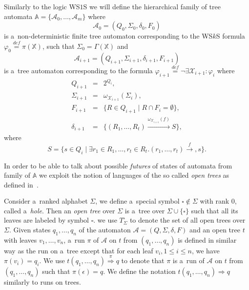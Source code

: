 Similarly to the logic WS$1$S we will define the hierarchical family of tree
automata $\mathbb{A} = \{\mathcal{A}_0,\ldots,\mathcal{A}_m\}$ where
\begin{equation}
 \mathcal{A}_0 = (Q_0, \Sigma_0, \delta_0, F_0)
\end{equation} is a~non-deterministic finite tree automaton corresponding to the
WS$k$S formula $\varphi_0 \overset{\mathit{def}}{=} \pi(\mathbb{X})$, such that
$\Sigma_0 = \Gamma(\mathbb{X})$ and
\begin{equation}
 \mathcal{A}_{i+1} = (Q_{i+1}, \Sigma_{i+1}, \delta_{i+1}, F_{i+1})
\end{equation}
is a~tree automaton corresponding to the formula $\varphi_{i+1}
\overset{\mathit{def}}{=} \neg\exists\mathcal{X}_{i+1}: \varphi_i$ where
\begin{eqnarray}
 Q_{i+1} & = & 2^{Q_i},\\
 \Sigma_{i+1} & = & \omega_{\mathcal{X}_{i+1}}(\Sigma_i),\\
 F_{i+1} & = & \{R \in Q_{i+1} \mid R \cap F_i = \emptyset\},\\
 \delta_{i+1} & = & \{(R_1,\ldots,R_t)
 \overset{\omega_{\mathcal{X}_{i+1}}(f)}{\longrightarrow} S\},
\end{eqnarray}
where
\begin{equation}
S = \{s \in Q_i \mid \exists r_1 \in R_1,\ldots,r_t \in R_t.
 (r_1,\ldots,r_t) \overset{f}{\longrightarrow}, s\}.
\end{equation}

In order to be able to talk about possible \emph{futures} of states of automata
from family of $\mathbb{A}$ we exploit the notion of languages of the so called
\emph{open trees} as defined in~\cite{tacas}.

Consider a~ranked alphabet $\Sigma$, we define a~special symbol $\square \notin
\Sigma$ with rank 0, called a~\emph{hole}. Then an \emph{open tree} over
$\Sigma$ is a~tree over $\Sigma \cup \{\square\}$ such that all its leaves are
labeled by symbol $\square$. we use $T_\Sigma^\square$ to denote the set of all
open trees over $\Sigma$. Given states $q_1,\ldots,q_n$ of the automaton
$\mathcal{A} = (Q, \Sigma, \delta, F)$ and an open tree $t$ with leaves
$v_1,\ldots,v_n$, a~run $\pi$ of $\mathcal{A}$ on $t$ from $(q_1,\ldots,q_n)$ is
defined in similar way as the run on a~tree except that for each leaf $v_i, 1
\leq i \leq n$, we have $\pi(v_i) = q_i$. We use $t(q_1,\ldots,q_n)
\overset{\pi}{\Longrightarrow} q$ to denote that $\pi$ is a~run of $\mathcal{A}$
on $t$ from $(q_1,\ldots,q_n)$ such that $\pi(\epsilon) = q$. We define the
notation $t(q_1,\ldots,q_n) \Longrightarrow q$ similarly to runs on trees.

